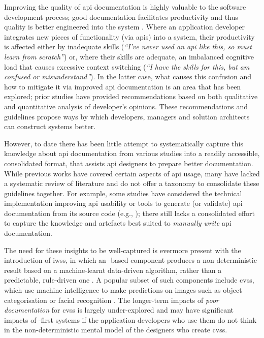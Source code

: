 Improving the quality of \gls{api} documentation is highly valuable to the software development process; good documentation facilitates productivity and thus quality is better engineered into the system \citep{mcleod2011factors}. Where an application developer integrates new pieces of functionality (via \glspl{api}) into a system, their productivity is affected either by inadequate skills (\textit{``I've never used an \gls{api} like this, so must learn from scratch''}) or, where their skills are adequate, an imbalanced cognitive load that causes excessive context switching (\textit{``I have the skills for this, but am confused or misunderstand''}). In the latter case, what causes this confusion and how to mitigate it via improved \gls{api} documentation is an area that has been explored; prior studies have provided recommendations based on both qualitative and quantitative analysis of developer's opinions. These recommendations and guidelines propose ways by which developers, managers and solution architects can construct systems better.

However, to date there has been little attempt to systematically capture this knowledge about \gls{api} documentation from various studies into a readily accessible, consolidated format, that assists \gls{api} designers to prepare better documentation. While previous works have covered certain aspects of \gls{api} usage, many have lacked a systematic review of literature and do not offer a taxonomy to consolidate these guidelines together. For example, some studies have considered the technical implementation improving \gls{api} usability or tools to generate (or validate) \gls{api} documentation from its source code (e.g., \citep{Nybom:2018ef,Watson:2012uy,Maalej2013}); there still lacks a consolidated effort to capture the knowledge and artefacts best suited to \textit{manually write} \gls{api} documentation.

 The need for these insights to be well-captured is evermore present with the introduction of \glspl{iws}, in which an -based component produces a non-deterministic result based on a machine-learnt data-driven algorithm, rather than a predictable, rule-driven one \citep{Cummaudo:2019icsme}. A popular subset of such components include \glspl{cvs}, which use machine intelligence to make predictions on images such as object categorisation or facial recognition . The longer-term impacts of \textit{poor documentation} for \glspl{cvs} is largely under-explored and may have significant impacts of -first systems if the application developers who use them do not think in the non-deterministic mental model of the designers who create \glspl{cvs}.

